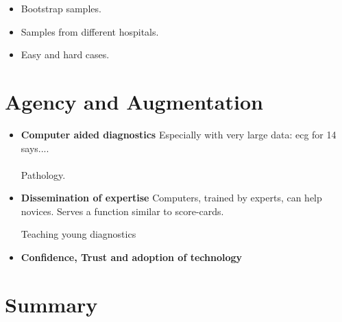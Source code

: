 \documentclass[9pt,twocolumn,twoside]{pnas-new}
\begin{document}

\begin{itemize}
  \item Bootstrap samples.
  \item Samples from different hospitals.
  \item Easy and hard cases.
  \end{itemize}

\section*{Agency and Augmentation}
\begin{itemize}
\item{\bf Computer aided diagnostics}
  Especially with very large data: ecg for 14 says.... \\
  ~\\

Pathology.

\item {\bf Dissemination of expertise}
Computers, trained by experts, can help novices.  Serves a function
similar to score-cards.

Teaching young diagnostics
\item { \bf Confidence, Trust and adoption of technology}
\end{itemize}

\section*{Summary}

% 

\end{document}
